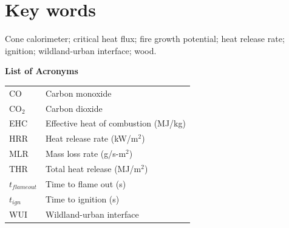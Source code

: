 \documentclass[12pt]{article}
\renewcommand{\contentsname}{Table of Contents}
\begin{document}
\section*{Key words}
Cone calorimeter; critical heat flux; fire growth potential; heat release rate; ignition; wildland-urban interface; wood.

\pagebreak
\tableofcontents
\pagebreak

\listoftables
\pagebreak

\listoffigures
\pagebreak

{
\renewcommand{\contentsname}{List of Acronyms}
\noindent\Large\bfseries List of Acronyms\par
}
\vspace{1em}

\noindent
\begin{tabular}{@{}ll@{}}
    CO & Carbon monoxide \\
    CO$_2$ & Carbon dioxide \\
    EHC & Effective heat of combustion (MJ/kg) \\
    HRR & Heat release rate (kW/m$^2$) \\
    MLR & Mass loss rate (g/s-m$^2$) \\
    THR & Total heat release (MJ/m$^2$) \\
    $t_{flameout}$ & Time to flame out (s) \\
    $t_{ign}$ & Time to ignition (s) \\
    WUI & Wildland-urban interface \\
\end{tabular}

\pagebreak

\end{document}
